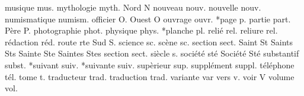 musique             mus.%
mythologie          myth.%
{Nord}              N%
nouveau             nouv.%
nouvelle            nouv.%
numismatique        numism.%
officier            O.%
{Ouest}             O%
ouvrage             ouvr.%
*page               p.%
partie              part.%
P\`{e}re                P.%
photographie        phot.%
physique            phys.%
*planche            pl.%
reli\'{e}             rel.%
reliure             rel.%
r\'{e}daction         r\'{e}d.
route               rte%
{Sud}               S.%
science             sc.%
sc\`{e}ne               sc.%
section             sect.%
{Saint}             St%
{Saints}            Sts%
{Sainte}            Ste%
{Saintes}           Stes%
section             sect.%
si\`{e}cle             s.%
{soci\'{e}t\'{e}}           st\'{e}%
{Soci\'{e}t\'{e}}           St\'{e}%
substantif          subst.%
*suivant            suiv.%
*suivante           suiv.%
sup\`{e}rieur           sup.%
suppl\'{e}ment          suppl.%
t\'{e}l\'{e}phone           t\'{e}l.%
tome                t.%
traducteur          trad.%
traduction          trad.%
variante            var%
vers                v.%
voir                V%
volume              vol.%


